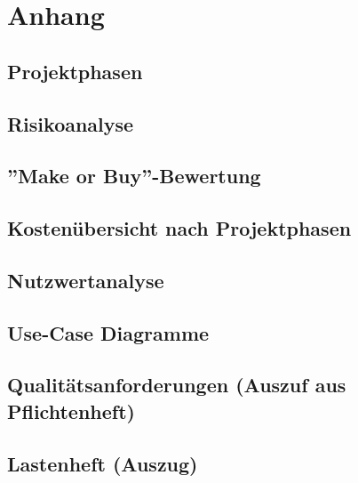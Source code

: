 \renewcommand{\thesection}{\Alph{subsection}}

\appendix
{}
\section{Anhang}
	
	\subsection{Projektphasen}		
		
		\newpage

	\subsection{Risikoanalyse}		
		
		\newpage		
		
	\subsection{''Make or Buy''-Bewertung}		
		
		\newpage
	
	\subsection{Kostenübersicht nach Projektphasen}		
		
		\newpage

	\subsection{Nutzwertanalyse}		
		
		\newpage
		
	\subsection{Use-Case Diagramme}		
		
		\newpage		
		
	\subsection{Qualitätsanforderungen (Auszuf aus Pflichtenheft)}		
		
		\newpage
		
	\subsection{Lastenheft (Auszug)}
		
		\newpage
		
